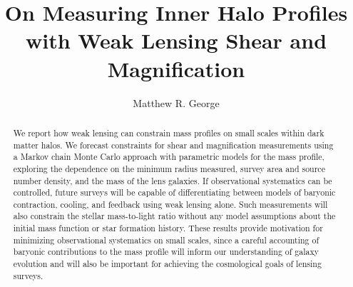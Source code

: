 \documentclass[12pt]{emulateapj}
\begin{document}
  

 \title{On Measuring Inner Halo Profiles with Weak Lensing Shear and Magnification}



\author{Matthew R. George}


  
\begin{abstract}
  We report how weak lensing can constrain mass profiles on small
  scales within dark matter halos. We forecast constraints for shear
  and magnification measurements using a
  Markov chain Monte Carlo approach with parametric models for the
  mass profile, exploring the dependence on the minimum radius
  measured, survey area and source number density, and the mass of the
  lens galaxies. If observational systematics can be controlled, future
  surveys will be capable of differentiating between models of
  baryonic contraction, cooling, and feedback using weak lensing
  alone. Such measurements will also constrain the stellar
  mass-to-light ratio without any model assumptions about the initial
  mass function or star formation history. These results
  provide motivation for minimizing observational systematics on small
  scales, since a careful accounting of baryonic contributions to the
  mass profile will inform our understanding of galaxy evolution and
  will also be important for achieving the cosmological goals of
  lensing surveys.
\end{abstract}
 


\end{document}
